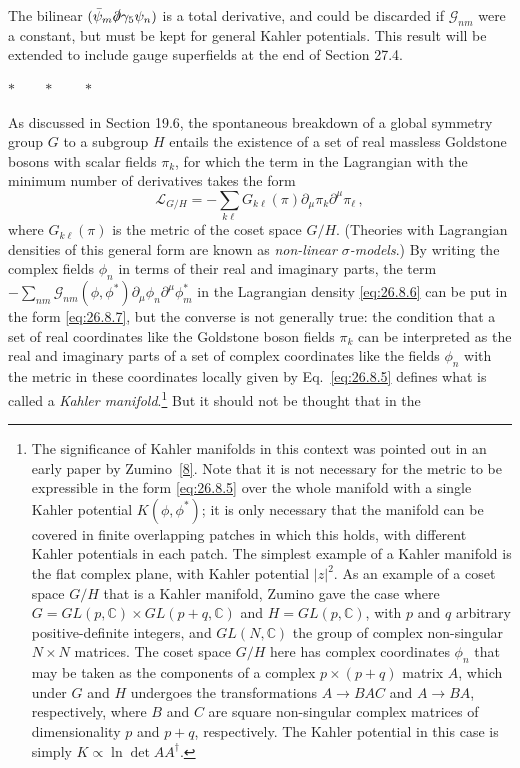 The bilinear \((\bar\psi_m\sl{\partial}\gamma_5\psi_n)\) is a total
derivative, and could be discarded if \(\mathcal{G}_{nm}\) were a constant,
but must be kept for general Kahler potentials. This result will be extended
to include gauge superfields at the end of Section 27.4.

\begin{center}
\(\ast\qquad\ast\qquad\ast\)
\end{center}

As discussed in Section 19.6, the spontaneous breakdown of a global symmetry
group \(G\) to a subgroup \(H\) entails the existence of a set of real
massless Goldstone bosons with scalar fields \(\pi_k\), for which the term in
the Lagrangian with the minimum number of derivatives takes the form
\begin{equation}
  \mathcal{L}_{G/H}
  =-\sum_{k\ell}G_{k\ell}(\pi)
    \partial_\mu\pi_k\partial^\mu\pi_\ell\,,
  \tag{26.8.7}\label{eq:26.8.7}
\end{equation}
where \(G_{k\ell}(\pi)\) is the metric of the coset space \(G/H\). (Theories
with Lagrangian densities of this general form are known as
\textit{non-linear \(\sigma\)-models}.) By writing the complex fields
\(\phi_n\) in terms of their real and imaginary parts, the term
\(-\sum_{nm}\mathcal{G}_{nm}(\phi,\phi^*)
\partial_\mu\phi_n\partial^\mu\phi_m^*\) in the Lagrangian density
\eqref{eq:26.8.6} can be put in the form \eqref{eq:26.8.7}, but the converse
is not generally true: the condition that a set of real coordinates like the
Goldstone boson fields \(\pi_k\) can be interpreted as the real and imaginary
parts of a set of complex coordinates like the fields \(\phi_n\) with the
metric in these coordinates locally given by Eq.~\eqref{eq:26.8.5} defines
what is called a \textit{Kahler manifold}.\footnote{The significance of
Kahler manifolds in this context was pointed out in an early paper by
Zumino~\hyperref[ch26-ref-8]{[8]}. Note that it is not necessary for the
metric to be expressible in the form \eqref{eq:26.8.5} over the whole
manifold with a single Kahler potential \(K(\phi,\phi^*)\); it is only
necessary that the manifold can be covered in finite overlapping patches in
which this holds, with different Kahler potentials in each patch. The
simplest example of a Kahler manifold is the flat complex plane, with Kahler
potential \(\lvert z\rvert^2\). As an example of a coset space \(G/H\) that
is a Kahler manifold, Zumino gave the case where
\(G=GL(p,\mathbb{C})\times GL(p+q,\mathbb{C})\) and
\(H=GL(p,\mathbb{C})\), with \(p\) and \(q\) arbitrary positive-definite
integers, and \(GL(N,\mathbb{C})\) the group of complex non-singular
\(N\times N\) matrices. The coset space \(G/H\) here has complex coordinates
\(\phi_n\) that may be taken as the components of a complex
\(p\times(p+q)\) matrix \(A\), which under \(G\) and \(H\) undergoes the
transformations \(A\to BAC\) and \(A\to BA\), respectively, where \(B\) and
\(C\) are square non-singular complex matrices of dimensionality \(p\) and
\(p+q\), respectively. The Kahler potential in this case is simply
\(K\propto\ln\det AA^\dagger\).} But it should not be thought that in the
